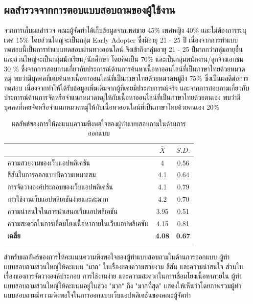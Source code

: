 \documentclass[12pt,oneside,openright,a4paper]{cpe-thai-project}
\begin{document}
    \subsection{ผลสำรวจจากการตอบแบบสอบถามของผู้ใช้งาน}
      \hspace{1cm}จากการเก็บผลสำรวจ คณะผู้จัดทำได้เก็บข้อมูลจากเพศชาย 45\% เพศหญิง 40\% และไม่ต้องการระบุเพศ 15\%
      โดยส่วนใหญ่จะเป็นกลุ่ม Early Adopter ซึ่งมีอายุ 21 - 25 ปี เนื่องจากการทำแบบทดสอบนี้เป็นการทำแบบทดสอบผ่านทางออนไลน์ จึงเข้าถึงกลุ่มอายุ 21 - 25 ปีมากกว่ากลุ่มอายุอื่น
      และส่วนใหญ่จะเป็นกลุ่มนักเรียน/นักศึกษา โดยคิดเป็น 70\% และเป็นกลุ่มพนักงาน/ลูกจ้างเอกชน 30 \%
      ซึ่งจากการสอบถามเกี่ยวกับประการณ์ด้านการค้นหาเนื้อหาออนไลน์ที่เป็นภาษาไทยด้วยหมวดหมู่ 
      พบว่ามีบุคคลที่เคยค้นหาเนื้อหาออนไลน์ที่เป็นภาษาไทยด้วยหมวดหมู่ถึง 75\% 
      ซึ่งเป็นผลดีต่อการทดสอบ เนื่องจากทำให้ได้รับข้อมูลเพิ่มเติมจากผู้ที่เคยมีประสบการณ์จริง
      และจากการสอบถามเกี่ยวกับประการณ์ด้านการจัดหรือจำแนกหมวดหมู่ให้กับเนื้อหาออนไลน์ที่เป็นภาษาไทยด้วยตนเอง
      พบว่ามีบุคคลที่เคยจัดหรือจำแนกหมวดหมู่ให้กับเนื้อหาออนไลน์ที่เป็นภาษาไทยด้วยตนเอง 20\% 
      \newpage
      \begin{longtable}{lcc}
        \caption{ผลลัพธ์ของการให้คะแนนความพึงพอใจของผู้ทำแบบสอบถามในด้านการออกแบบ}
        \label{tbl:design_score}\\
        \hhline{===}
        \multicolumn{1}{c}{\textbf{หัวข้อ}}                & \textbf{$\bar{X}$} & \textbf{$S.D.$} \\ \hline
        \endhead
        ความสวยงามของเว็บแอปพลิเคชัน                       & 4          & 0.56          \\
        สีสันในการออกแบบมีความเหมาะสม                      & 4.1        & 0.64          \\
        การจัดวางองค์ประกอบของเว็บแอปพลิเคชัน              & 4.1        & 0.79          \\
        การใช้งานเว็บแอปพลิเคชันง่ายและสะดวก               & 4.2        & 0.70          \\
        ความน่าสนใจในการนำเสนอเว็บแอปพลิเคชัน              & 3.95       & 0.51          \\
        ความสะดวกในการเชื่อมโยงเนื้อหาภายในเว็บแอปพลิเคชัน & 4.15       & 0.81          \\ \hline
        \textbf{เฉลี่ย}                                    & \textbf{4.08}        & \textbf{0.67}     \\ \hhline{===}    
      \end{longtable}
      \hspace{1cm}สำหรับผลลัพธ์ของการให้คะแนนความพึงพอใจของผู้ทำแบบสอบถามในด้านการออกแบบ ผู้ทำแบบสอบถามส่วนใหญ่ให้คะแนน "มาก"
      ในเรื่องของความสวยงาม สีสัน และความน่าสนใจ ส่วนในเรื่องของการจัดวางองค์ประกอบ การใช้งานง่าย และความสะดวกในการเชื่อมโยงเนื้อหาภายใน
      ผู้ทำแบบสอบถามส่วนใหญ่ให้คะแนนอยู่ในช่วง "มาก" ถึง "มากที่สุด" 
      แสดงให้เห็นว่าโดยภาพรวมผู้ทำแบบสอบถามมีความพึงพอใจในการออกแบบเว็บแอปพลิเคชันของคณะผู้จัดทำ
\end{document}
